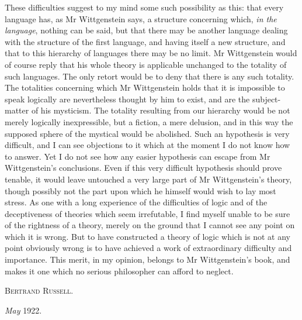 \documentclass[12pt,oneside]{book}[2007/10/19]
\begin{document}
These difficulties suggest to my mind some such
possibility as this: that every language has, as Mr
Wittgenstein says, a structure concerning which, \emph{in the
language}, nothing can be said, but that there may be
another language dealing with the structure of the first
language, and having itself a new structure, and that to
this hierarchy of languages there may be no limit. Mr
Wittgenstein would of course reply that his whole theory
is applicable unchanged to the totality of such languages.
The only retort would be to deny that there is any such
totality. The totalities concerning which Mr Wittgenstein
holds that it is impossible to speak logically are nevertheless
thought by him to exist, and are the subject-matter of his
mysticism. The totality resulting from our hierarchy
would be not merely logically inexpressible, but a fiction,
a mere delusion, and in this way the supposed sphere of
the mystical would be abolished. Such an hypothesis is
very difficult, and I can see objections to it which at the
moment I do not know how to answer. Yet I do not
see how any easier hypothesis can escape from Mr
Wittgenstein's conclusions. Even if this very difficult
hypothesis should prove tenable, it would leave untouched
a very large part of Mr Wittgenstein's theory, though
possibly not the part upon which he himself would wish
to lay most stress. As one with a long experience of the
difficulties of logic and of the deceptiveness of theories
which seem irrefutable, I find myself unable to be sure
of the rightness of a theory, merely on the ground that I
cannot see any point on which it is wrong. But to have
constructed a theory of logic which is not at any point
obviously wrong is to have achieved a work of extraordinary
difficulty and importance. This merit, in my
opinion, belongs to Mr Wittgenstein's book, and makes
it one which no serious philosopher can afford to neglect.

\begin{minipage}{0.9\textwidth}
\vspace{3.5ex}
\begin{flushright}
\textsc{Bertrand Russell.}
\end{flushright}

{\small \textit{May} 1922.}
\end{minipage}
\end{document}
